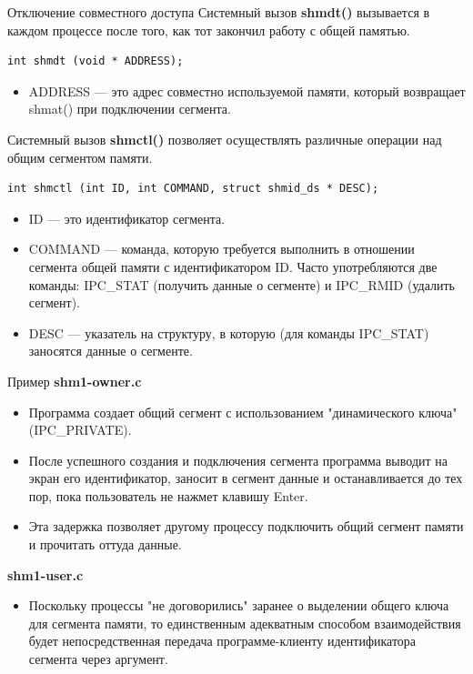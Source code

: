 \documentclass[xcolor=table]{beamer}
\begin{document}
\begin{frame}[fragile]{Отключение совместного доступа}
	Системный вызов \textbf{shmdt()} вызывается в каждом процессе после того, как тот закончил работу с общей памятью. 
	\begin{verbatim}
int shmdt (void * ADDRESS);
	\end{verbatim}
	\begin{itemize}
		\item ADDRESS — это адрес совместно используемой памяти, который возвращает shmat() при подключении сегмента.
	\end{itemize}
	Системный вызов \textbf{shmctl()} позволяет осуществлять различные операции над общим сегментом памяти.
	\begin{verbatim}
int shmctl (int ID, int COMMAND, struct shmid_ds * DESC);
	\end{verbatim}
	\begin{itemize}
		\item ID — это идентификатор сегмента. 
		\item COMMAND — команда, которую требуется выполнить в отношении сегмента общей памяти с идентификатором ID. Часто употребляются две команды: IPC\_STAT (получить данные о сегменте) и IPC\_RMID (удалить сегмент).
		\item DESC — указатель на структуру, в которую (для команды IPC\_STAT) заносятся данные о сегменте. 
	\end{itemize}
\end{frame}

\begin{frame}[fragile]{Пример}
	\textbf{shm1-owner.c}
	\begin{itemize}
		\item Программа создает общий сегмент с использованием "динамического ключа" (IPC\_PRIVATE). 
		\item После успешного создания и подключения сегмента программа выводит на экран его идентификатор, заносит в сегмент данные и останавливается до тех пор, пока пользователь не нажмет клавишу Enter. 
		\item Эта задержка позволяет другому процессу подключить общий сегмент памяти и прочитать оттуда данные.
\end{itemize}
	\textbf{shm1-user.c}
	\begin{itemize}
		\item Поскольку процессы "не договорились" заранее о выделении общего ключа для сегмента памяти, то единственным адекватным способом взаимодействия будет непосредственная передача программе-клиенту идентификатора сегмента через аргумент.
	\end{itemize}
\end{frame}
\end{document}
